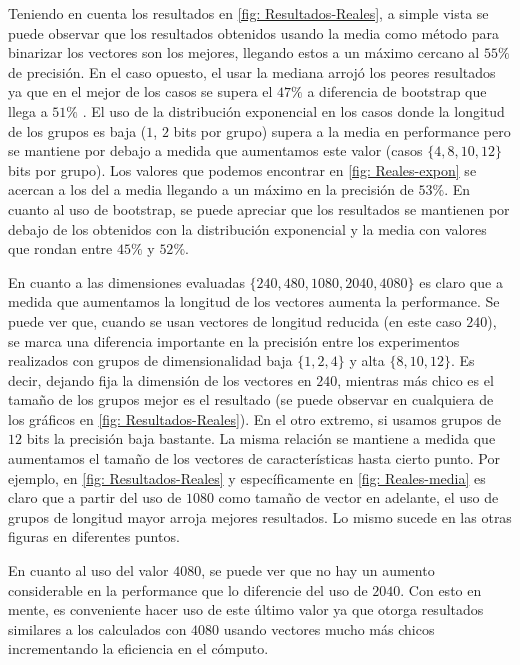 	Teniendo en cuenta los resultados en \ref{fig: Resultados-Reales}, a simple vista se puede observar que los resultados obtenidos usando la media como método para binarizar los vectores son los mejores, llegando estos a un máximo cercano al $55\%$ de precisión. En el caso opuesto, el usar la mediana arrojó los peores resultados ya que en el mejor de los casos se supera el $47\%$ a diferencia de bootstrap que llega a $51\%$ . El uso de la distribución exponencial en los casos donde la longitud de los grupos es baja ($1$, $2$ bits por grupo) supera a la media en performance pero se mantiene por debajo a medida que aumentamos este valor (casos $\{ 4, 8, 10, 12\}$ bits por grupo). Los valores que podemos encontrar en \ref{fig: Reales-expon} se acercan a los del a media llegando a un máximo en la precisión de $53\%$. En cuanto al uso de bootstrap, se puede apreciar que los resultados se mantienen por debajo de los obtenidos con la distribución exponencial y la media con valores que rondan entre $45\%$ y $52\%$.
	
	En cuanto a las dimensiones evaluadas $\{ 240, 480, 1080, 2040, 4080 \}$ es claro que a medida que aumentamos la longitud de los vectores aumenta la performance. Se puede ver que, cuando se usan vectores de longitud reducida (en este caso $240$), se marca una diferencia importante en la precisión entre los experimentos realizados con grupos de dimensionalidad baja $\{ 1, 2, 4 \}$ y alta $\{8, 10, 12\}$. Es decir, dejando fija la dimensión de los vectores en $240$, mientras más chico es el tamaño de los grupos mejor es el resultado (se puede observar en cualquiera de los gráficos en \ref{fig: Resultados-Reales}). En el otro extremo, si usamos grupos de $12$ bits la precisión baja bastante. La misma relación se mantiene a medida que aumentamos el tamaño de los vectores de características hasta cierto punto. Por ejemplo, en \ref{fig: Resultados-Reales} y específicamente en \ref{fig: Reales-media} es claro que a partir del uso de $1080$ como tamaño de vector en adelante, el uso de grupos de longitud mayor arroja mejores resultados. Lo mismo sucede en las otras figuras en diferentes puntos. 
	
	En cuanto al uso del valor $4080$, se puede ver que no hay un aumento considerable en la performance que lo diferencie del uso de $2040$. Con esto en mente, es conveniente hacer uso de este último valor ya que otorga resultados similares a los calculados con $4080$ usando vectores mucho más chicos incrementando la eficiencia en el cómputo.
	
